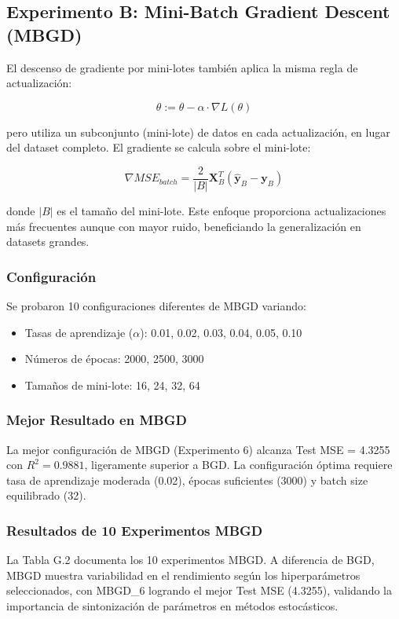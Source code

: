\documentclass[conference]{IEEEtran}
\begin{document}
\subsection{Experimento B: Mini-Batch Gradient Descent (MBGD)}

El descenso de gradiente por mini-lotes también aplica la misma regla de actualización:

$$\theta := \theta - \alpha \cdot \nabla L(\theta)$$

pero utiliza un subconjunto (mini-lote) de datos en cada actualización, en lugar del dataset completo. El gradiente se calcula sobre el mini-lote:

$$\nabla MSE_{batch} = \frac{2}{|B|} \mathbf{X}_B^T (\hat{\mathbf{y}}_B - \mathbf{y}_B)$$

donde $|B|$ es el tamaño del mini-lote. Este enfoque proporciona actualizaciones más frecuentes aunque con mayor ruido, beneficiando la generalización en datasets grandes.

\subsubsection{Configuración}

Se probaron 10 configuraciones diferentes de MBGD variando:
\begin{itemize}
\item Tasas de aprendizaje ($\alpha$): 0.01, 0.02, 0.03, 0.04, 0.05, 0.10
\item Números de épocas: 2000, 2500, 3000
\item Tamaños de mini-lote: 16, 24, 32, 64
\end{itemize}

\subsubsection{Mejor Resultado en MBGD}

La mejor configuración de MBGD (Experimento 6) alcanza Test MSE = 4.3255 con $R^2 = 0.9881$, ligeramente superior a BGD. La configuración óptima requiere tasa de aprendizaje moderada (0.02), épocas suficientes (3000) y batch size equilibrado (32).

\subsubsection{Resultados de 10 Experimentos MBGD}

La Tabla G.2 documenta los 10 experimentos MBGD. A diferencia de BGD, MBGD muestra variabilidad en el rendimiento según los hiperparámetros seleccionados, con MBGD\_6 logrando el mejor Test MSE (4.3255), validando la importancia de sintonización de parámetros en métodos estocásticos.
\end{document}
